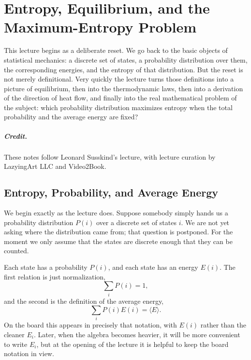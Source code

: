 \chapter{Entropy, Equilibrium, and the Maximum-Entropy Problem}

This lecture begins as a deliberate reset. We go back to the basic objects of statistical mechanics: a discrete set of states, a probability distribution over them, the corresponding energies, and the entropy of that distribution. But the reset is not merely definitional. Very quickly the lecture turns those definitions into a picture of equilibrium, then into the thermodynamic laws, then into a derivation of the direction of heat flow, and finally into the real mathematical problem of the subject: which probability distribution maximizes entropy when the total probability and the average energy are fixed?

\paragraph{Credit.} These notes follow Leonard Susskind's lecture, with lecture curation by LazyingArt LLC and Video2Book.

\section{Entropy, Probability, and Average Energy}

We begin exactly as the lecture does. Suppose somebody simply hands us a probability distribution \(P(i)\) over a discrete set of states \(i\). We are not yet asking where the distribution came from; that question is postponed. For the moment we only assume that the states are discrete enough that they can be counted.

Each state has a probability \(P(i)\), and each state has an energy \(E(i)\). The first relation is just normalization,
\begin{equation}
\sum_i P(i)=1,
\end{equation}
and the second is the definition of the average energy,
\begin{equation}
\sum_i P(i)E(i)=\langle E\rangle.
\end{equation}
On the board this appears in precisely that notation, with \(E(i)\) rather than the cleaner \(E_i\). Later, when the algebra becomes heavier, it will be more convenient to write \(E_i\), but at the opening of the lecture it is helpful to keep the board notation in view.

